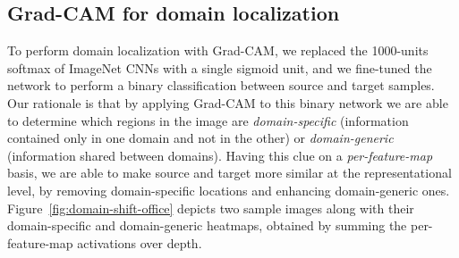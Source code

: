 \documentclass[../main.tex]{subfiles}
\begin{document}
    \subsection{Grad-CAM for domain localization}\label{subsec:gradcam-domainness}

    To perform domain localization with Grad-CAM, we replaced the 1000-units softmax of ImageNet CNNs with a single sigmoid
    unit, and we fine-tuned the network to perform a binary classification between source and target samples. Our rationale is
    that by applying Grad-CAM to this binary network we are able to determine which regions
    in the image are \textit{domain-specific} (information contained only in one domain and not in the other) or
    \textit{domain-generic} (information shared between domains). Having this clue on a \textit{per-feature-map} basis,
    we are able to make source and target more similar at the representational level, by removing domain-specific locations and
    enhancing domain-generic ones. Figure~\ref{fig:domain-shift-office} depicts two sample images along with their domain-specific and
    domain-generic heatmaps, obtained by summing the per-feature-map activations over depth. \\
\end{document}
